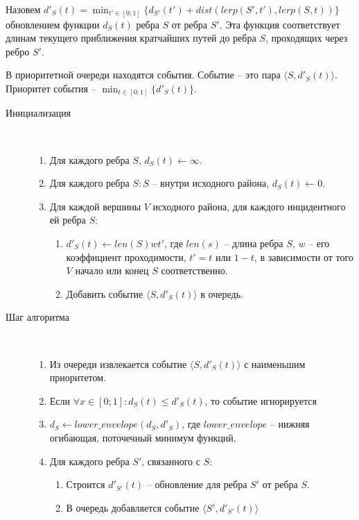 Назовем $\displaystyle d'_S(t) = \min_{t' \in [0; 1]}\{d_{S'}(t') + dist(lerp(S', t'), lerp(S, t))\}$
обновлением функции $d_S(t)$ ребра $S$ от ребра $S'$. Эта функция
соответствует длинам текущего приближения кратчайших путей до ребра $S$,
проходящих через ребро $S'$.

В приоритетной очереди находятся события. Событие -- это пара
$\langle S, d'_S(t) \rangle$. Приоритет события -- $\displaystyle\min_{t \in [0; 1]}\{d'_S(t)\}$.

\begin{description}
\item[Инициализация]\hfill \\
\begin{enumerate}
\item Для каждого ребра $S$, $d_S(t) \gets \infty$.
\item Для каждого ребра $S: S$ -- внутри исходного района, $d_S(t) \gets 0$.
\item Для каждой вершины $V$ исходного района, для каждого инцидентного ей
ребра $S$:
  \begin{enumerate}
  \item $d'_S(t) \gets len(S)wt'$, где $len(s)$ -- длина ребра $S$,
    $w$ -- его коэффициент проходимости, $t' = t$ или $1 - t$, в зависимости от
    того $V$ начало или конец $S$ соответственно.
  \item Добавить событие $\langle S, d'_S(t) \rangle$ в очередь.
  \end{enumerate}
\end{enumerate}

\item[Шаг алгоритма]\hfill \\
\begin{enumerate}
\item Из очереди извлекается событие $\langle S, d'_S(t) \rangle$ с наименьшим приоритетом.
\item Если $\forall x \in [0; 1]: d_S(t) \leq d'_S(t)$, то событие игнорируется
\item $d_S \gets lower\_envelope(d_S, d'_S)$, где $lower\_envelope$ --
нижняя огибающая, поточечный минимум функций.
\item Для каждого ребра $S'$, связанного с $S$:
  \begin{enumerate}
  \item Строится $d'_{S'}(t)$ -- обновление для ребра $S'$ от ребра $S$.
  \item В очередь добавляется событие $\langle S', d'_{S'}(t) \rangle$
  \end{enumerate}
\end{enumerate}
\end{description}

